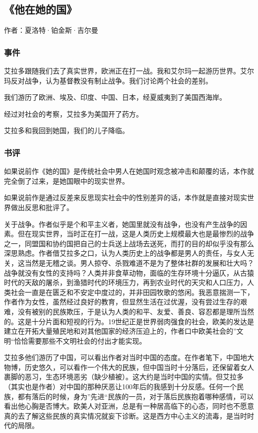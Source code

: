 \subsection{《他在她的国》}

作者：夏洛特·铂金斯·吉尔曼

\subsubsection{事件}
艾拉多跟随我们去了真实世界，欧洲正在打一战。我和艾尔玛一起游历世界。艾尔玛反对战争，认为基督教没有制止战争。我们讨论两个社会的差别。

我们游历了欧洲、埃及、印度、中国、日本，经夏威夷到了美国西海岸。

经过对社会的考察，艾拉多为美国开了药方。

艾拉多和我回到她国，我们的儿子降临。

\subsubsection{书评}
如果说前作《她的国》是传统社会中男人在她国时观念被冲击和颠覆的话，本作就完全倒了过来，是她国眼中的现实世界。

如果说前作是通过反差来反思现实社会中的性别差异的话，本作就是直接对现实世界做出反思和批评了。

关于战争。作者似乎是个和平主义者，她国里就没有战争，也没有产生战争的因素。但在现实世界，当时正在打一战，这是人类历史上规模最大也是最惨烈的战争之一，同盟国和协约国把自己的士兵送上战场去送死，而打的目的却似乎没有那么深思熟虑。作者借艾拉多之口，认为人类历史上的战争都是男人的责任，与女人无关，这当然是无稽之谈。男人掠夺、杀戮难道不是为了整体社群的发展和壮大吗？战争就没有女性的支持吗？人类并非食草动物，面临的生存环境十分逼仄，从古猿时代的天敌的屠杀，到渔猎时代的环境压力，再到农业时代的天灾和人口压力，人类社会一直是在匮乏和不安定中度过的，并非田园牧歌的悠闲。我恶意揣测一下，作者作为女性，虽然经过良好的教育，但显然生活在过优渥，没有尝过生存的艰难，没有被别的民族欺压，于是认为人类的和平、友爱、善良、容忍都是理所当然的。这是十分片面和短视的行为。19世纪正是世界弱肉强食的社会，欧美的发达是建立在开拓大量殖民地和对其他国家的经济压迫上的，作者口中欧美社会的”文明“恰恰需要那些不文明社会的付出才能实现。

艾拉多他们游历了中国，可以看出作者对当时中国的态度。在作者笔下，中国地大物博，历史悠久，可以看作一个伟大的民族，但中国当时十分落后，还保留着女人裹脚的恶习，生态环境恶劣（缺少植被）。这大约是当时中国的实情。但艾拉多（其实也是作者）对中国的那种厌恶让100年后的我感到十分反感。任何一个民族，都有落后的时候，身为”先进“民族的一员，对于落后民族抱着哪种感情，可以看出他心胸是否博大。欧美人对亚洲，总是有一种居高临下的心态，同时也不愿意真的去了解这些民族的真实情况就妄下诊断。这是西方中心主义的流毒，是当时时代的局限。

